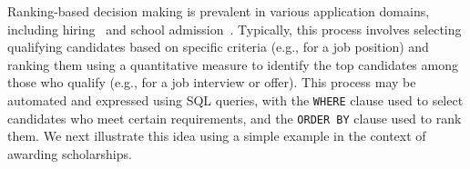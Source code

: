 Ranking-based decision making is prevalent in various application domains, including hiring~\cite{GeyikAK19} and school admission~\cite{peskun2007effectiveness}. Typically, this process involves selecting qualifying candidates based on specific criteria (e.g., for a job position) and ranking them using a quantitative measure to identify the top candidates among those who qualify (e.g., for a job interview or offer). This process may be automated and expressed using %
SQL queries, with the {\tt WHERE} clause used to select candidates who meet certain requirements, and the {\tt ORDER BY} clause used to rank them. We next illustrate this idea using a simple example in the context of awarding scholarships.


